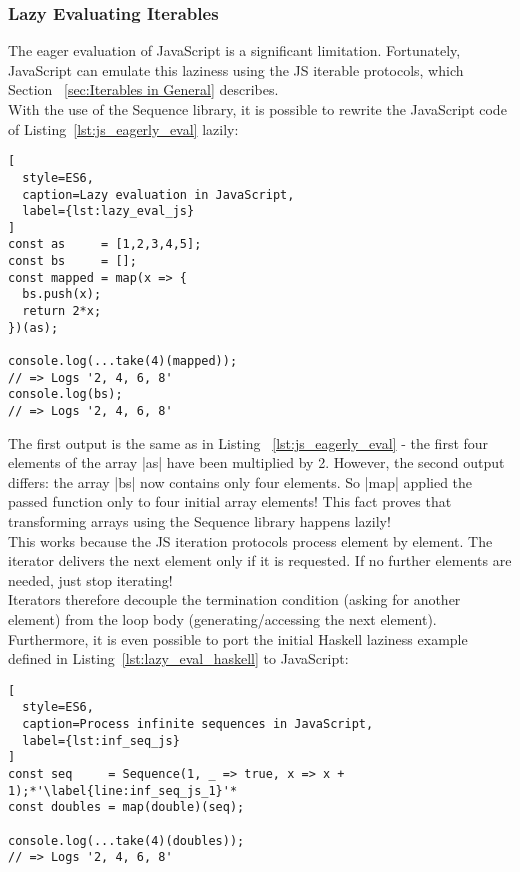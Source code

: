 \subsubsection{Lazy Evaluating Iterables} %
\label{subsub:Lazy Evaluate Iterables}

The eager evaluation of JavaScript is a significant limitation. Fortunately,
JavaScript can emulate this laziness using the JS iterable protocols, which
Section ~\ref{sec:Iterables in General} describes. \\ 

With the use of the Sequence library, it is possible to rewrite the JavaScript
code of Listing~\ref{lst:js_eagerly_eval} lazily:

\begin{lstlisting}[
  style=ES6,
  caption=Lazy evaluation in JavaScript,
  label={lst:lazy_eval_js}
]
const as     = [1,2,3,4,5];
const bs     = [];
const mapped = map(x => {
  bs.push(x);
  return 2*x;
})(as);

console.log(...take(4)(mapped));
// => Logs '2, 4, 6, 8'
console.log(bs);
// => Logs '2, 4, 6, 8'
\end{lstlisting}
The first output is the same as in Listing ~\ref{lst:js_eagerly_eval} - the
first four elements of the array |as| have been multiplied by 2. However, the
second output differs: the array |bs| now contains only four elements. So |map|
applied the passed function only to four initial array elements! This fact
proves that transforming arrays using the Sequence library happens lazily!\\
This works because the JS iteration protocols process element by element. The
iterator delivers the next element only if it is requested. If no further
elements are needed, just stop iterating! \\
Iterators therefore decouple the termination condition (asking for another
element) from the loop body (generating/accessing the next element).\\

Furthermore, it is even possible to port the initial Haskell laziness
example defined in Listing~\ref{lst:lazy_eval_haskell} to JavaScript:
\begin{lstlisting}[
  style=ES6,
  caption=Process infinite sequences in JavaScript,
  label={lst:inf_seq_js}
]
const seq     = Sequence(1, _ => true, x => x + 1);*'\label{line:inf_seq_js_1}'*
const doubles = map(double)(seq);

console.log(...take(4)(doubles));
// => Logs '2, 4, 6, 8'
\end{lstlisting}

